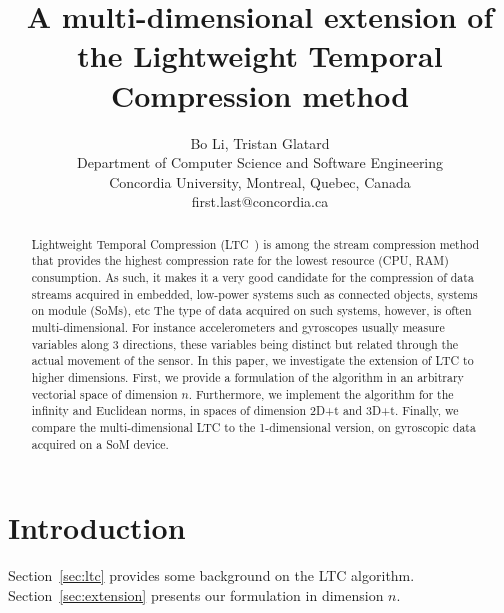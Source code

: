 \documentclass[10pt, conference, compsocconf]{IEEEtran}
\begin{document}
\title{A multi-dimensional extension of the Lightweight Temporal Compression method}

\author{Bo Li, Tristan Glatard\\
  Department of Computer Science and Software Engineering\\ Concordia University, Montreal, Quebec, Canada\\
  {first.last}@concordia.ca \vspace*{-0.5cm}}

\maketitle

\begin{abstract}
Lightweight Temporal Compression
(LTC~\cite{schoellhammer2004lightweight}) is among the stream
compression method that provides the highest compression rate for the
lowest resource (CPU, RAM) consumption. As such, it makes it a very
good candidate for the compression of data streams acquired in
embedded, low-power systems such as connected
objects, systems on module (SoMs), etc The type of data acquired on
such systems, however, is often multi-dimensional. For instance
accelerometers and gyroscopes usually measure variables along 3
directions, these variables being distinct but related through the
actual movement of the sensor. In this paper, we investigate the
extension of LTC to higher dimensions. First, we provide a formulation of the algorithm
in an arbitrary vectorial space of dimension $n$. Furthermore, we
implement the algorithm for the infinity and Euclidean norms, in spaces of
dimension 2D+t and 3D+t. Finally, we compare the multi-dimensional LTC
to the 1-dimensional version, on gyroscopic data acquired on a SoM
device.
\end{abstract}

\section{Introduction}

Section~\ref{sec:ltc} provides some background on the LTC algorithm.
Section~\ref{sec:extension} presents our formulation in dimension $n$.




\end{document}
